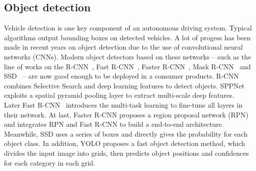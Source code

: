 \documentclass[10pt,twocolumn,letterpaper]{article}
\begin{document}
\subsection{Object detection}
Vehicle detection is one key component of an autonomous driving system. Typical algorithms output bounding boxes on detected vehicles.
A lot of progess has been made in recent years on object detection due to the use of convolutional neural networks (CNNs).
Modern object detectors based on these networks -- such as the line of works on the R-CNN~\cite{girshick2014rich},
Fast R-CNN~\cite{Girshick2015Fast}, Faster R-CNN~\cite{ren2015faster_nips}, Mask R-CNN~\cite{he2017mask} and  SSD~\cite{liu2016ssd} -- are now good enough to be deployed in a consumer products.
 R-CNN~\cite{girshick2014rich} combines Selective Search and deep learning features to detect objects.
  SPPNet \cite{He2015Spatial} exploits a spatial pyramid pooling layer to extract multi-scale deep features. Later Fast R-CNN~\cite{Girshick2015Fast} introduces the multi-task learning to fine-tune all layers in their network. At last, Faster R-CNN \cite{ren2015faster_nips} proposes a region proposal network (RPN) and integrates RPN and Fast R-CNN to build a end-to-end architecture. Meanwhile, SSD \cite{liu2016ssd} uses a series of boxes and directly gives the probability for each object class. In addition, YOLO \cite{redmon2016you} proposes a fast object detection method, which divides the input image into grids, then predicts object positions and confidences for each category in each grid.


\end{document}
